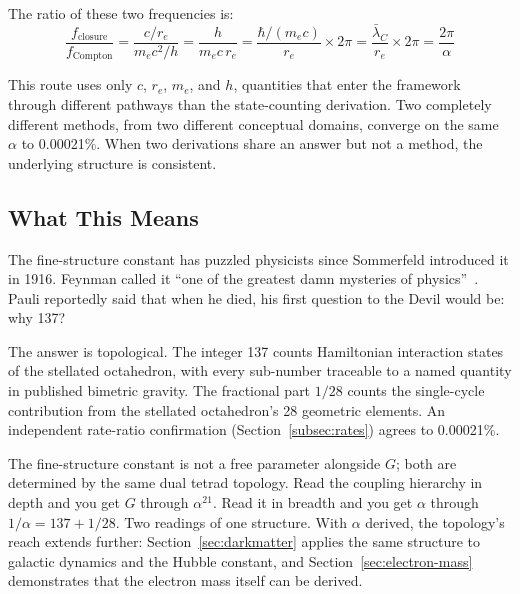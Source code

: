 \documentclass[aps,prd,preprint,superscriptaddress,showpacs,preprintnumbers,amsmath,amssymb,nofootinbib]{revtex4-2}
\begin{document}
The ratio of these two frequencies is:
\begin{equation}
\frac{f_{\text{closure}}}{f_{\text{Compton}}} = \frac{c/r_e}{m_e c^2/h} = \frac{h}{m_e c\,r_e} = \frac{\hbar/(m_e c)}{r_e} \times 2\pi = \frac{\bar{\lambda}_C}{r_e} \times 2\pi = \frac{2\pi}{\alpha}
\end{equation}

This route uses only $c$, $r_e$, $m_e$, and $h$, quantities that enter the framework through different pathways than the state-counting derivation. Two completely different methods, from two different conceptual domains, converge on the same $\alpha$ to 0.00021\%. When two derivations share an answer but not a method, the underlying structure is consistent.

\subsection{What This Means}
\label{subsec:alpha-meaning}

The fine-structure constant has puzzled physicists since Sommerfeld introduced it in 1916. Feynman called it ``one of the greatest damn mysteries of physics''~\cite{feynman1985}. Pauli reportedly said that when he died, his first question to the Devil would be: why 137?

The answer is topological. The integer 137 counts Hamiltonian interaction states of the stellated octahedron, with every sub-number traceable to a named quantity in published bimetric gravity. The fractional part $1/28$ counts the single-cycle contribution from the stellated octahedron's 28 geometric elements. An independent rate-ratio confirmation (Section~\ref{subsec:rates}) agrees to 0.00021\%.

The fine-structure constant is not a free parameter alongside $G$; both are determined by the same dual tetrad topology. Read the coupling hierarchy in depth and you get $G$ through $\alpha^{21}$. Read it in breadth and you get $\alpha$ through $1/\alpha = 137 + 1/28$. Two readings of one structure. With $\alpha$ derived, the topology's reach extends further: Section~\ref{sec:darkmatter} applies the same structure to galactic dynamics and the Hubble constant, and Section~\ref{sec:electron-mass} demonstrates that the electron mass itself can be derived.

\end{document}
